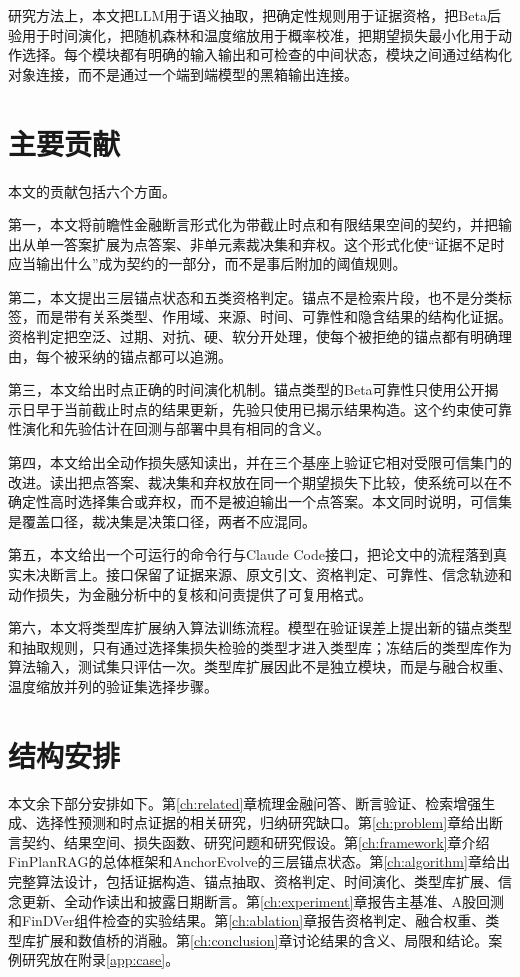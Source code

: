 研究方法上，本文把LLM用于语义抽取，把确定性规则用于证据资格，把Beta后验用于时间演化，把随机森林和温度缩放用于概率校准，把期望损失最小化用于动作选择。每个模块都有明确的输入输出和可检查的中间状态，模块之间通过结构化对象连接，而不是通过一个端到端模型的黑箱输出连接。

\section{主要贡献}

本文的贡献包括六个方面。

第一，本文将前瞻性金融断言形式化为带截止时点和有限结果空间的契约，并把输出从单一答案扩展为点答案、非单元素裁决集和弃权。这个形式化使“证据不足时应当输出什么”成为契约的一部分，而不是事后附加的阈值规则。

第二，本文提出三层锚点状态和五类资格判定。锚点不是检索片段，也不是分类标签，而是带有关系类型、作用域、来源、时间、可靠性和隐含结果的结构化证据。资格判定把空泛、过期、对抗、硬、软分开处理，使每个被拒绝的锚点都有明确理由，每个被采纳的锚点都可以追溯。

第三，本文给出时点正确的时间演化机制。锚点类型的Beta可靠性只使用公开揭示日早于当前截止时点的结果更新，先验只使用已揭示结果构造。这个约束使可靠性演化和先验估计在回测与部署中具有相同的含义。

第四，本文给出全动作损失感知读出，并在三个基座上验证它相对受限可信集门的改进。读出把点答案、裁决集和弃权放在同一个期望损失下比较，使系统可以在不确定性高时选择集合或弃权，而不是被迫输出一个点答案。本文同时说明，可信集是覆盖口径，裁决集是决策口径，两者不应混同。

第五，本文给出一个可运行的命令行与Claude Code接口，把论文中的流程落到真实未决断言上。接口保留了证据来源、原文引文、资格判定、可靠性、信念轨迹和动作损失，为金融分析中的复核和问责提供了可复用格式。\par
第六，本文将类型库扩展纳入算法训练流程。模型在验证误差上提出新的锚点类型和抽取规则，只有通过选择集损失检验的类型才进入类型库；冻结后的类型库作为算法输入，测试集只评估一次。类型库扩展因此不是独立模块，而是与融合权重、温度缩放并列的验证集选择步骤。

\section{结构安排}

本文余下部分安排如下。第\ref{ch:related}章梳理金融问答、断言验证、检索增强生成、选择性预测和时点证据的相关研究，归纳研究缺口。第\ref{ch:problem}章给出断言契约、结果空间、损失函数、研究问题和研究假设。第\ref{ch:framework}章介绍FinPlanRAG的总体框架和AnchorEvolve的三层锚点状态。第\ref{ch:algorithm}章给出完整算法设计，包括证据构造、锚点抽取、资格判定、时间演化、类型库扩展、信念更新、全动作读出和披露日期断言。第\ref{ch:experiment}章报告主基准、A股回测和FinDVer组件检查的实验结果。第\ref{ch:ablation}章报告资格判定、融合权重、类型库扩展和数值桥的消融。第\ref{ch:conclusion}章讨论结果的含义、局限和结论。案例研究放在附录\ref{app:case}。

